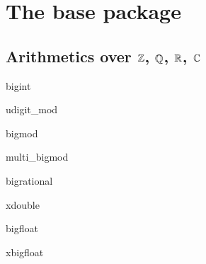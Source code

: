 %
%
%
%

\part*{The \LiDIA base package}



\chapter{Arithmetics over $\mathbb{Z}$, $\mathbb{Q}$, $\mathbb{R}$, $\mathbb{C}$}


\begin{class}{bigint}
  
\end{class}

\begin{class}{udigit_mod}
  
\end{class}

\begin{class}{bigmod}
  
\end{class}

\begin{class}{multi_bigmod}
  
\end{class}

\begin{class}{bigrational}
  
\end{class}

\begin{class}{xdouble}
  
\end{class}

\begin{class}{bigfloat}
  
\end{class}

\begin{class}{xbigfloat}
  
\end{class}

%  

